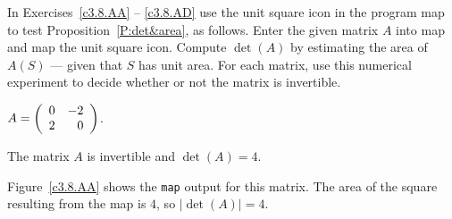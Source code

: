 \documentclass{ximera}
\begin{document}
\noindent  In Exercises~\ref{c3.8.AA} -- \ref{c3.8.AD} use the {\sf unit 
square} icon in the program {\sf map} to test Proposition~\ref{P:det&area}, as 
follows. Enter the given matrix $A$ into {\sf map} and map the {\sf unit 
square} icon.  Compute $\det(A)$ by estimating the area of $A(S)$ --- given 
that $S$ has unit area.  For each matrix, use this numerical experiment to 
decide whether or not the matrix is invertible.
\begin{computerExercise}  \label{c3.8.AA}
$A=\left(\begin{array}{rr} 0 & -2\\ 2 &0\end{array}\right)$.

\begin{solution}
\ans The matrix $A$ is invertible and $\det(A) = 4$.

\soln Figure~\ref{c3.8.AA} shows the {\tt map} output for this matrix.
The area of the square resulting from the map is $4$, so $|\det(A)| = 4$.

\end{solution}
\end{computerExercise}
\end{document}
